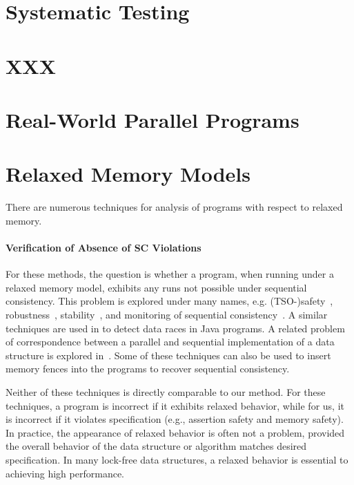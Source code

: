 \section{Systematic Testing}

\section{XXX}

\section{Real-World Parallel Programs}


\section{Relaxed Memory Models}

There are numerous techniques for analysis of programs with respect to relaxed memory.

\paragraph{Verification of Absence of SC Violations}

For these methods, the question is whether a program, when running under a relaxed memory model, exhibits any runs not possible under sequential consistency.
This problem is explored under many names, e.g. (TSO-)safety~\cite{Burckhardt2008}, robustness~\cite{Bouajjani2013,Derevenetc2014}, stability~\cite{Alglave2011}, and monitoring of sequential consistency~\cite{Burnim2011}.
A similar techniques are used in \cite{Yang2004} to detect data races in Java programs.
A related problem of correspondence between a parallel and sequential implementation of a data structure is explored in~\cite{Ou2017}.
Some of these techniques can also be used to insert memory fences into the programs to recover sequential consistency.

Neither of these techniques is directly comparable to our method.
For these techniques, a program is incorrect if it exhibits relaxed behavior, while for us, it is incorrect if it violates specification (e.g., assertion safety and memory safety).
In practice, the appearance of relaxed behavior is often not a problem, provided the overall behavior of the data structure or algorithm matches desired specification.
In many lock-free data structures, a relaxed behavior is essential to achieving high performance.

